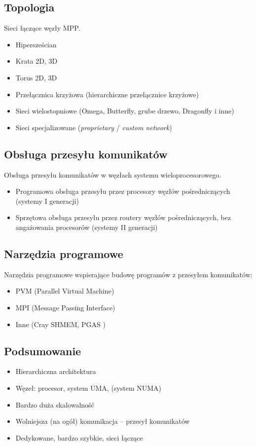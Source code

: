 		\subsection{Topologia}
			Sieci łączące węzły MPP.
			\begin{itemize}
				\item Hipersześcian
				\item Krata 2D, 3D
				\item Torus 2D, 3D
				\item Przełącznica krzyżowa (hierarchiczne przełącznice krzyżowe)
				\item Sieci wielostopniowe (Omega, Butterfly, grube drzewo, Dragonfly i inne)
				\item Sieci specjalizowane (\emph{proprietary} / \emph{custom network})
			\end{itemize}
		\subsection{Obsługa przesyłu komunikatów}
			Obsługa przesyłu komunikatów w węzłach systemu wieloprocesorowego.
			\begin{itemize}
				\item Programowa obsługa przesyłu przez procesory węzłów pośredniczących (systemy I generacji)
				\item Sprzętowa obsługa przesyłu przez routery węzłów pośredniczących, bez angażowania procesorów (systemy II generacji)
			\end{itemize}
		\subsection{Narzędzia programowe}
			Narzędzia programowe wspierające budowę programów z przesyłem komunikatów:
			\begin{itemize}
				\item PVM (Parallel Virtual Machine)
				\item MPI (Message Passing Interface)
				\item Inne (Cray SHMEM, PGAS )
			\end{itemize}
		\subsection{Podsumowanie}
			\begin{itemize}
				\item Hierarchiczna architektura
				\item Węzeł: procesor, system UMA, (system NUMA)
				\item Bardzo duża skalowalność
				\item Wolniejsza (na ogół) komunikacja – przesył komunikatów
				\item Dedykowane, bardzo szybkie, sieci łączące
			\end{itemize}
			\vfill
